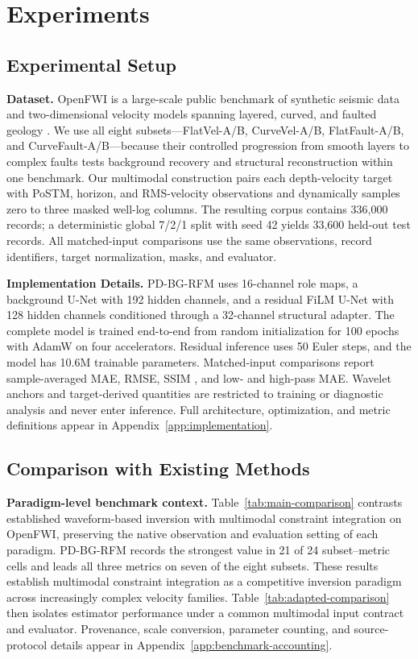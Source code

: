 \documentclass[letterpaper]{article}
\begin{document}
\section{Experiments}

\subsection{Experimental Setup}
\textbf{Dataset.} OpenFWI is a large-scale public benchmark of synthetic seismic data and two-dimensional velocity models spanning layered, curved, and faulted geology \cite{deng2022openfwi}. We use all eight subsets---FlatVel-A/B, CurveVel-A/B, FlatFault-A/B, and CurveFault-A/B---because their controlled progression from smooth layers to complex faults tests background recovery and structural reconstruction within one benchmark. Our multimodal construction pairs each depth-velocity target with PoSTM, horizon, and RMS-velocity observations and dynamically samples zero to three masked well-log columns. The resulting corpus contains 336,000 records; a deterministic global 7/2/1 split with seed 42 yields 33,600 held-out test records. All matched-input comparisons use the same observations, record identifiers, target normalization, masks, and evaluator.

\textbf{Implementation Details.} PD-BG-RFM uses 16-channel role maps, a background U-Net with 192 hidden channels, and a residual FiLM U-Net with 128 hidden channels conditioned through a 32-channel structural adapter. The complete model is trained end-to-end from random initialization for 100 epochs with AdamW \cite{loshchilov2019decoupled} on four accelerators. Residual inference uses 50 Euler steps, and the model has 10.6M trainable parameters. Matched-input comparisons report sample-averaged MAE, RMSE, SSIM \cite{wang2004ssim}, and low- and high-pass MAE. Wavelet anchors and target-derived quantities are restricted to training or diagnostic analysis and never enter inference. Full architecture, optimization, and metric definitions appear in Appendix~\ref{app:implementation}.

\subsection{Comparison with Existing Methods}
\textbf{Paradigm-level benchmark context.} Table~\ref{tab:main-comparison} contrasts established waveform-based inversion with multimodal constraint integration on OpenFWI, preserving the native observation and evaluation setting of each paradigm. PD-BG-RFM records the strongest value in 21 of 24 subset--metric cells and leads all three metrics on seven of the eight subsets. These results establish multimodal constraint integration as a competitive inversion paradigm across increasingly complex velocity families. Table~\ref{tab:adapted-comparison} then isolates estimator performance under a common multimodal input contract and evaluator. Provenance, scale conversion, parameter counting, and source-protocol details appear in Appendix~\ref{app:benchmark-accounting}.
\end{document}

